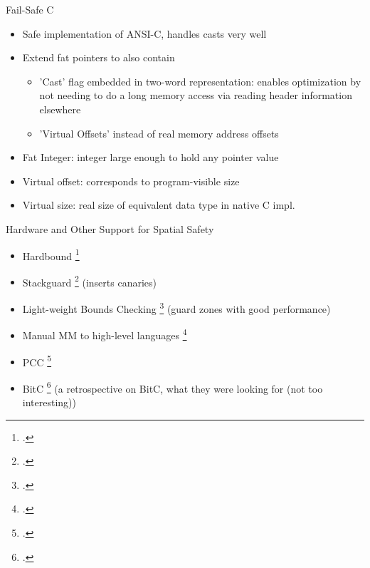 \documentclass[aspectratio=169]{beamer}
\begin{document}
\begin{frame}{Fail-Safe C}
\begin{itemize}
\item Safe implementation of ANSI-C, handles casts very well
\item Extend fat pointers to also contain
    \begin{itemize}
        \item 'Cast' flag embedded in two-word representation: enables optimization by not needing to do a long memory access via reading header information elsewhere
        \item 'Virtual Offsets' instead of real memory address offsets
    \end{itemize}
\item Fat Integer: integer large enough to hold any pointer value
\item Virtual offset: corresponds to program-visible size
\item Virtual size: real size of equivalent data type in native C impl.
\end{itemize}
\end{frame}

\begin{frame}{Hardware and Other Support for Spatial Safety}
\begin{itemize}
    \item Hardbound \footcite{devietti_hardbound:_2008}
    \item Stackguard \footcite{cowan_stackguard:_1998} (inserts canaries)
    \item Light-weight Bounds Checking \footcite{hasabnis_light-weight_2012} (guard zones with good performance)
    \item Manual MM to high-level languages \footcite{kedia_simple_2017}
    \item PCC \footcite{necula_proof-carrying_1997}
    \item BitC \footcite{shapiro_origins_2008} (a retrospective on BitC, what they were looking for (not too interesting))
\end{itemize}
\end{frame}
\end{document}
